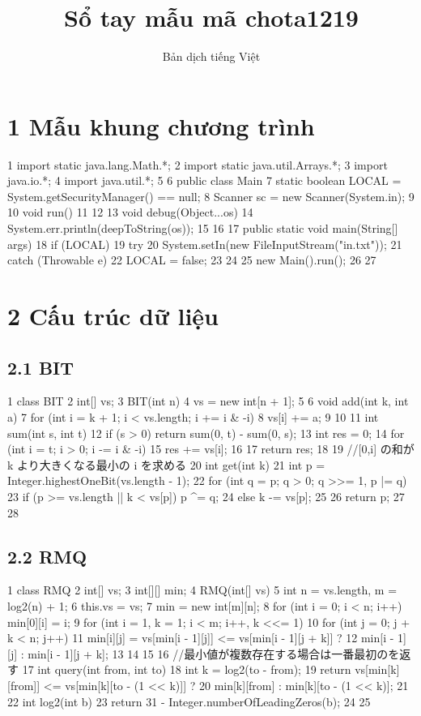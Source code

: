 \documentclass[11pt]{article}
\title{Sổ tay mẫu mã chota1219}
\author{Bản dịch tiếng Việt}
\date{}
\begin{document}
\maketitle
\section{1 Mẫu khung chương trình}
\begin{Code}
1 import static java.lang.Math.*;
2 import static java.util.Arrays.*;
3 import java.io.*;
4 import java.util.*;
5
6 public class Main {
7 static boolean LOCAL = System.getSecurityManager() == null;
8 Scanner sc = new Scanner(System.in);
9
10 void run() {
11 }
12
13 void debug(Object...os) {
14 System.err.println(deepToString(os));
15 }
16
17 public static void main(String[] args) {
18 if (LOCAL) {
19 try {
20 System.setIn(new FileInputStream("in.txt"));
21 } catch (Throwable e) {
22 LOCAL = false;
23 }
24 }
25 new Main().run();
26 }
27 }
\end{Code}
\section{2 Cấu trúc dữ liệu}
\subsection{2.1 BIT}
\begin{Code}
1 class BIT {
2 int[] vs;
3 BIT(int n) {
4 vs = new int[n + 1];
5 }
6 void add(int k, int a) {
7 for (int i = k + 1; i < vs.length; i += i & -i) {
8 vs[i] += a;
9 }
10 }
11 int sum(int s, int t) {
12 if (s > 0) return sum(0, t) - sum(0, s);
13 int res = 0;
14 for (int i = t; i > 0; i -= i & -i) {
15 res += vs[i];
16 }
17 return res;
18 }
19 //[0,i] の和が k より大きくなる最小の i を求める
20 int get(int k) {
21 int p = Integer.highestOneBit(vs.length - 1);
22 for (int q = p; q > 0; q >>= 1, p |= q) {
23 if (p >= vs.length || k < vs[p]) p ^= q;
24 else k -= vs[p];
25 }
26 return p;
27 }
28 }
\end{Code}
\subsection{2.2 RMQ}
\begin{Code}
1 class RMQ {
2 int[] vs;
3 int[][] min;
4 RMQ(int[] vs) {
5 int n = vs.length, m = log2(n) + 1;
6 this.vs = vs;
7 min = new int[m][n];
8 for (int i = 0; i < n; i++) min[0][i] = i;
9 for (int i = 1, k = 1; i < m; i++, k <<= 1) {
10 for (int j = 0; j + k < n; j++) {
11 min[i][j] = vs[min[i - 1][j]] <= vs[min[i - 1][j + k]] ?
12 min[i - 1][j] : min[i - 1][j + k];
13 }
14 }
15 }
16 //最小値が複数存在する場合は一番最初のを返す
17 int query(int from, int to) {
18 int k = log2(to - from);
19 return vs[min[k][from]] <= vs[min[k][to - (1 << k)]] ?
20 min[k][from] : min[k][to - (1 << k)];
21 }
22 int log2(int b) {
23 return 31 - Integer.numberOfLeadingZeros(b);
24 }
25 }
\end{Code}
\end{document}
